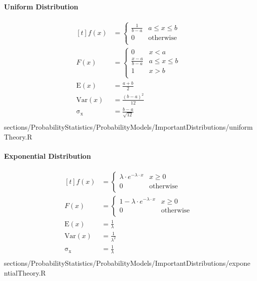 			\paragraph{Uniform Distribution}
				\RTheory%
				{%
					$$\begin{aligned}[t]
						f(x) 			&= 	\begin{cases}
												\frac{1}{b - a} 	& a \leq x \leq b\\
												0					& \mathrm{otherwise}\\ 
											\end{cases}\\
						F(x) 			&= 	\begin{cases}
												0					& x < a\\
												\frac{x-a}{b - a} 	& a \leq x \leq b\\
												1					& x > b\\ 
											\end{cases}\\
						\mathrm{E}(x) 	&= \frac{a+b}{2}\\
						\mathrm{Var}(x) &= \frac{(b-a)^2}{12}\\
						\mathrm{\sigma_x} &= \frac{b-a}{\sqrt{12}}\\
					\end{aligned}$$
				}{sections/ProbabilityStatistics/ProbabilityModels/ImportantDistributions/uniformTheory.R}
				
				\paragraph{Exponential Distribution}
				\RTheory%
				{%
					$$\begin{aligned}[t]
						f(x) 			&= 	\begin{cases}
												\lambda\cdot e^{-\lambda\cdot x} 	& x \geq 0\\
												0					& \mathrm{otherwise}\\ 
											\end{cases}\\
						F(x) 			&= 	\begin{cases}
												1- \lambda\cdot e^{-\lambda\cdot x} 	& x \geq 0\\
												0					& \mathrm{otherwise}\\ 
											\end{cases}\\
						\mathrm{E}(x) 	&= \frac{1}{\lambda}\\
						\mathrm{Var}(x) &= \frac{1}{\lambda^2}\\
					    \mathrm{\sigma_x} &= \frac{1}{\lambda}\\
					\end{aligned}$$
				}{sections/ProbabilityStatistics/ProbabilityModels/ImportantDistributions/exponentialTheory.R}
